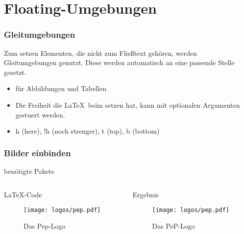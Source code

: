 \section{Floating-Umgebungen}
\begin{frame}
    \frametitle{Gleitumgebungen}
    Zum setzen Elementen, die nicht zum Fließtext gehören, werden Gleitumgebungen genutzt. Diese werden automatisch an eine passende Stelle gesetzt.
    \begin{itemize}
        \item für Abbildungen und Tabellen
        \item Die Freiheit die \LaTeX \ beim setzen hat, kann mit optionalen Argumenten gestuert werden.
        \item h  (here), !h (noch strenger), t (top), b (bottom)
    \end{itemize}
\end{frame}
\begin{frame}[fragile]
    \frametitle{Bilder einbinden}
    \begin{block}{benötigte Pakete}
        \begin{lstverbatim}
        \usepackage{graphicx}
        \usepackage[labelfont=bf]{caption}
        \end{lstverbatim}
    \end{block}
    \begin{columns}[T]
        \begin{column}{0.6\textwidth}
            \begin{block}{\LaTeX-Code}
                \begin{lstverbatim}
                \begin{figure}
                    \centering
                    \texttt{[image: logos/pep.pdf]}
                    \caption{Das Pep-Logo}
                    \label{fig:peplogo}
                \end{figure}
                \end{lstverbatim}
            \end{block}
        \end{column}
        \begin{column}{0.35\textwidth}
            \begin{block}{Ergebnis}
                \begin{figure}
                    \centering
                    \texttt{[image: logos/pep.pdf]}
                    \caption{Das PeP-Logo}
                    \label{fig:peplogo}
                \end{figure}
            \end{block}
        \end{column}
    \end{columns}
\end{frame}

